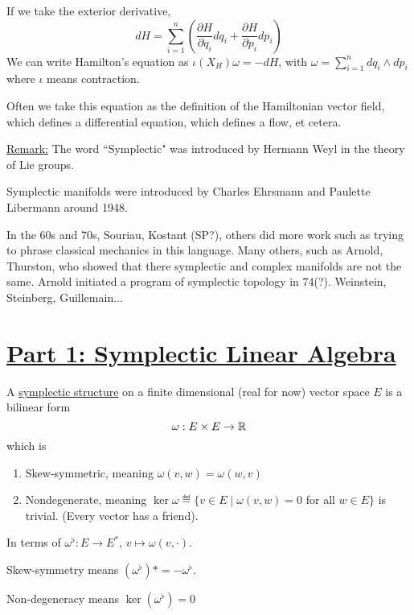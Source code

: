 \documentclass[x11names,reqno,14pt]{extarticle}
\newcommand{\pp}[2]{\frac{\partial #1}{\partial #2}}
\begin{document}
If we take the exterior derivative, 
\[
dH = \sum_{i=1}^n\left(\pp{H}{q_i}dq_i + \pp{H}{p_i}dp_i\right)
\]
We can write Hamilton's equation as $\iota(X_H)\omega = - dH$, with $\omega = \sum_{i=1}^ndq_i\wedge dp_i$ where $\iota$ means contraction. 

Often we take this equation as the definition of the Hamiltonian vector field, which defines a differential equation, which defines a flow, et cetera. 

\underline{Remark:} The word ``Symplectic" was introduced by Hermann Weyl in the theory of Lie groups. 

Symplectic manifolds were introduced by Charles Ehrsmann and Paulette Libermann around 1948. 

In the 60s and 70s, Souriau, Kostant (SP?), others did more work such as trying to phrase classical mechanics in this language. Many others, such as Arnold, Thurston, who showed that there symplectic and complex manifolds are not the same. Arnold initiated a program of symplectic topology in 74(?). Weinstein, Steinberg, Guillemain...

\section*{\underline{Part 1: Symplectic Linear Algebra}}


A \underline{symplectic structure} on a finite dimensional (real for now) vector space $E$ is a bilinear form
\[
\omega:E\times E \to \mathbb{R}
\]
which is
\begin{enumerate}[label=(\roman*)]

\item Skew-symmetric, meaning $\omega(v, w) = \omega(w, v)$

\item Nondegenerate, meaning $\ker \omega \eqdef \{v \in E \mid \omega(v, w) = 0$ for all $w \in E\}$ is trivial. (Every vector has a friend).

\end{enumerate}

In terms of $\omega^\flat:E\to E^*$, $v \mapsto \omega(v, \cdot)$. 

Skew-symmetry means $(\omega^\flat)* = -\omega^\flat$. 

Non-degeneracy means $\ker(\omega^\flat) = 0$

\exm
\,
\end{document}
